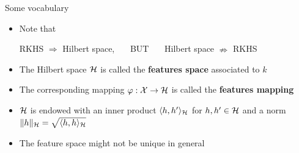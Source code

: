 \documentclass[xcolor={usenames,dvipsnames}]{beamer}
\begin{document}
%
%





\begin{frame}{Some vocabulary}
 \begin{itemize}
 	\item Note that 
 \begin{center}
 RKHS $\Rightarrow$ Hilbert space, \, \, \, BUT \, \, \, Hilbert space $\nRightarrow$ RKHS
 \pause 
 \end{center}
    \item The Hilbert space $\mathcal{H}$ is called the \textbf{features space} associated to $k$
    \pause 
    \item The corresponding mapping $\varphi : {\mathcal{X}} \rightarrow \mathcal{H}$ is called the \textbf{features mapping}
    \pause 
    \item $\mathcal{H}$ is endowed with an inner product $\langle h, h' \rangle_{\mathcal{H}}$ for $h, h' \in \mathcal{H}$ and a norm $\|h\|_{\mathcal{H}} = \sqrt{\langle h, h \rangle_{\mathcal{H}}}$
    \pause 
    \item The feature space might not be unique in general
  \end{itemize}
  
  \end{frame}
%  
  
\end{document}
